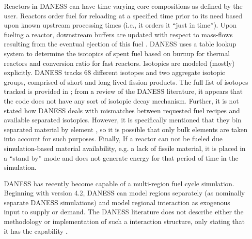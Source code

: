Reactors in DANESS can have time-varying core compositions as defined by the
user. Reactors order fuel for reloading at a specified time prior to its need
based upon known upstream processing times (i.e., it orders it ``just in
time''). Upon fueling a reactor, downstream buffers are updated with respect to
mass-flows resulting from the eventual ejection of this fuel
\cite{guerin_benchmark_2009}. DANESS uses a table lookup system to determine the
isotopics of spent fuel based on burnup for thermal reactors and conversion
ratio for fast reactors. Isotopics are modeled (mostly) explicitly. DANESS
tracks 68 different isotopes and two aggregate isotopic groups, comprised of
short and long-lived fission products. The full list of isotopes tracked is
provided in \cite{van_den_durpel_daness_2009}; from a review of the DANESS
literature, it appears that the code does not have any sort of isotopic decay
mechanism. Further, it is not stated how DANESS deals with mismatches between
requested fuel recipes and available separated isotopics. However, it is
specifically mentioned that they bin separated material by element
\cite{van_den_durpel_daness_2009}, so it is possible that only bulk elements are
taken into account for such purposes. Finally, If a reactor can not be fueled
due simulation-based material availability, e.g. a lack of fissile material, it
is placed in a ``stand by'' mode and does not generate energy for that period of
time in the simulation.

DANESS has recently become capable of a multi-region fuel cycle simulation.
Beginning with version 4.2, DANESS can model regions separately (as nominally
separate DANESS simulations) and model regional interaction as exogenous input
to supply or demand. The DANESS literature does not describe either the
methodology or implementation of such a interaction structure, only stating that
it has the capability \cite{van_den_durpel_daness_2009}.

